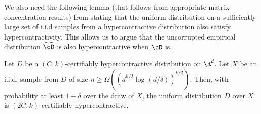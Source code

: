 \begin{lemma}
\label{lem:identifiability-least-squares-linear-sos}
\end{lemma}

We also need the following lemma (that follows from appropriate matrix concentration results) from \cite{DBLP:journals/corr/abs-1711-11581} stating that the uniform distribution on a sufficiently large set of i.i.d samples from a hypercontractive distribution also satisfy hypercontractivity. This allows us to argue that the uncorrupted empirical distribution $\widehat{\cD}$ is also hypercontractive when $\cD$ is. %



\begin{lemma}\label{fact:hypercontractivity-preserved-under-sampling}
Let $D$ be a $(C,k)$-certifiably hypercontractive distribution on $\R^d$. Let $X$ be an i.i.d. sample from $D$ of size $n \geq \Omega( (d^{k/2} \log{(d/\delta)})^{k/2})$. Then, with probability at least $1-\delta$ over the draw of $X$, the uniform distribution $D$ over $X$ is $(2C,k)$-certifiably hypercontractive.
\end{lemma}

